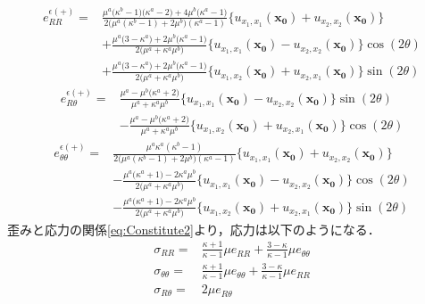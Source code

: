 \begin{align}
	e_{RR}^{\epsilon(+)}
	=&\frac{ \mu^{a}\bigl(\kappa^{b}-1\bigr)\bigl(\kappa^{a}-2\bigr)+4\mu^{b}\bigl(\kappa^{a}-1\bigr)　}
		{2\bigl(\mu^{a}(\kappa^{b}-1)+2\mu^{b}\bigr)(\kappa^{a}-1)}
	\bigl\{u_{x_{1},x_{1}}(\bm{x_{0}})+u_{x_{2},x_{2}}(\bm{x_{0}})\bigr\}
	\nonumber
	\\
	&+\frac{\mu^{a}\bigl(3-\kappa^{a}\bigr)+2\mu^{b}\bigl(\kappa^{a}-1\bigr)}{2\bigl(\mu^{a}+\kappa^{a}\mu^{b}\bigr)}
	\bigl\{u_{x_{1},x_{1}}(\bm{x_{0}})-u_{x_{2},x_{2}}(\bm{x_{0}})\bigr\}\cos(2\theta)
	\nonumber
	\\
	&+\frac{\mu^{a}\bigl(3-\kappa^{a}\bigr)+2\mu^{b}\bigl(\kappa^{a}-1\bigr)}{2\bigl(\mu^{a}+\kappa^{a}\mu^{b}\bigr)}
	\bigl\{u_{x_{1},x_{2}}(\bm{x_{0}})+u_{x_{2},x_{1}}(\bm{x_{0}})\bigr\}\sin(2\theta)
	\label{eq:eRROutEpsSol}
\end{align}
\begin{align}
	e_{R\theta}^{\epsilon(+)}
	=&\frac{\mu^{a}-\mu^{b}\bigl(\kappa^{a}+2\bigr)}{\mu^{a}+\kappa^{a}\mu^{b}}
	\bigl\{u_{x_{1},x_{1}}(\bm{x_{0}})-u_{x_{2},x_{2}}(\bm{x_{0}})\bigr\}\sin(2\theta)
	\nonumber
	\\
	&-\frac{\mu^{a}-\mu^{b}\bigl(\kappa^{a}+2\bigr)}{\mu^{a}+\kappa^{a}\mu^{b}}
	\bigl\{u_{x_{1},x_{2}}(\bm{x_{0}})+u_{x_{2},x_{1}}(\bm{x_{0}})\bigr\}\cos(2\theta)
	\label{eq:eRThOutEpsSol}
\end{align}
\begin{align}
	e_{\theta\theta}^{\epsilon(+)}
	=&\frac{\mu^{a}\kappa^{a}(\kappa^{b}-1)}
	{2\bigl(\mu^{a}(\kappa^{b}-1)+2\mu^{b}\bigr)(\kappa^{a}-1)}
	\bigl\{u_{x_{1},x_{1}}(\bm{x_{0}})+u_{x_{2},x_{2}}(\bm{x_{0}})\bigr\}
	\nonumber
	\\
	&-\frac{\mu^{a}\bigl(\kappa^{a}+1\bigr)-2\kappa^{a}\mu^{b}}{2\bigl(\mu^{a}+\kappa^{a}\mu^{b}\bigr)}
	\bigl\{u_{x_{1},x_{1}}(\bm{x_{0}})-u_{x_{2},x_{2}}(\bm{x_{0}})\bigr\}\cos(2\theta)
	\nonumber
	\\
	&-\frac{\mu^{a}\bigl(\kappa^{a}+1\bigr)-2\kappa^{a}\mu^{b}}{2\bigl(\mu^{a}+\kappa^{a}\mu^{b}\bigr)}
	\bigl\{u_{x_{1},x_{2}}(\bm{x_{0}})+u_{x_{2},x_{1}}(\bm{x_{0}})\bigr\}\sin(2\theta)
	\label{eq:eThThOutEpsSol}
\end{align}
歪みと応力の関係\eqref{eq:Constitute2}より，応力は以下のようになる．
\begin{align}
	\sigma_{RR}
	=&\frac{\kappa+1}{\kappa-1}\mu e_{RR}^{}+\frac{3-\kappa}{\kappa-1}\mu e_{\theta\theta}^{}
	\nonumber
	\\
	\sigma_{\theta\theta}
	=&\frac{\kappa+1}{\kappa-1}\mu e_{\theta\theta}^{}+\frac{3-\kappa}{\kappa-1}\mu e_{RR}^{}
	\nonumber
	\\
	\sigma_{R\theta}=&2\mu e_{R\theta}^{}
	\label{eq:Constitute2}
\end{align}

